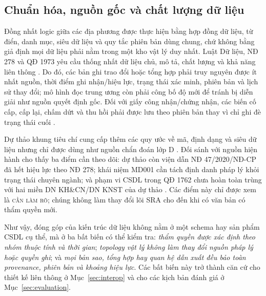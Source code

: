 \subsection{Chuẩn hóa, nguồn gốc và chất lượng dữ liệu}
\label{subsec:chuanhoa}

Đồng nhất logic giữa các địa phương được thực hiện bằng hợp đồng dữ liệu, từ điển, danh mục, siêu dữ liệu và quy tắc phiên bản dùng chung, chứ không bằng giả định mọi dữ liệu phải nằm trong một kho vật lý duy nhất. Luật Dữ liệu, NĐ 278 và QĐ 1973 yêu cầu thống nhất dữ liệu chủ, mô tả, chất lượng và khả năng liên thông \citep{luatdulieu2024,nd278_2025,qd1973_2026}. Do đó, các bản ghi trao đổi hoặc tổng hợp phải truy nguyên được ít nhất nguồn, thời điểm ghi nhận/hiệu lực, trạng thái xác minh, phiên bản và lịch sử thay đổi; mô hình đọc trung ương còn phải công bố độ mới để tránh bị diễn giải như nguồn quyết định gốc. Đối với giấy công nhận/chứng nhận, các biến cố cấp, cấp lại, chấm dứt và thu hồi phải được lưu theo phiên bản thay vì chỉ ghi đè trạng thái cuối \citep{nd268_2025}.

Dự thảo khung tiêu chí cung cấp thêm các quy ước về mã, định dạng và siêu dữ liệu nhưng chỉ được dùng như nguồn chẩn đoán lớp D \citep{duthao_khungtc}. Đối sánh với nguồn hiện hành cho thấy ba điểm cần theo dõi: dự thảo còn viện dẫn NĐ 47/2020/NĐ-CP đã hết hiệu lực theo NĐ 278; khái niệm MD001 cần tách định danh pháp lý khỏi trạng thái chuyên ngành; và phạm vi CSDL trong QĐ 1762 chưa hoàn toàn trùng với hai miền DN KH\&CN/DN KNST của dự thảo \citep{nd278_2025,qd1762_2025,duthao_khungtc}. Các điểm này chỉ được xem là \textsc{cần làm rõ}; chúng không làm thay đổi lõi SRA cho đến khi có văn bản có thẩm quyền mới.

Như vậy, đóng góp của kiến trúc dữ liệu không nằm ở một schema hay sản phẩm CSDL cụ thể, mà ở ba bất biến có thể kiểm tra: \emph{thẩm quyền được xác định theo nhóm thuộc tính và thời gian}; \emph{topology vật lý không làm thay đổi nguồn pháp lý hoặc quyền ghi}; và \emph{mọi bản sao, tổng hợp hay quan hệ dẫn xuất đều bảo toàn provenance, phiên bản và khoảng hiệu lực}. Các bất biến này trở thành căn cứ cho thiết kế liên thông ở Mục~\ref{sec:interop} và cho các kịch bản đánh giá ở Mục~\ref{sec:evaluation}.
